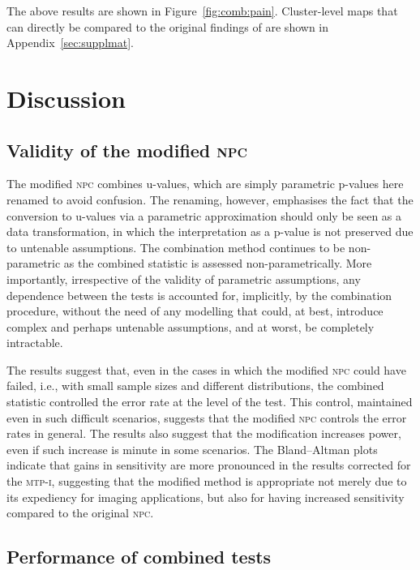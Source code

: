 The above results are shown in Figure~\ref{fig:comb:pain}. Cluster-level maps that can directly be compared to the original findings of \citet{Brooks2005} are shown in Appendix~\ref{sec:supplmat}.

\section{Discussion}

\subsection{Validity of the modified \textsc{npc}}

The modified \textsc{npc} combines u-values, which are simply parametric p-values here renamed to avoid confusion. The renaming, however, emphasises the fact that the conversion to u-values via a parametric approximation should only be seen as a data transformation, in which the interpretation as a p-value is not preserved due to untenable assumptions. The combination method continues to be non-parametric as the combined statistic is assessed non-parametrically. More importantly, irrespective of the validity of parametric assumptions, any dependence between the tests is accounted for, implicitly, by the combination procedure, without the need of any modelling that could, at best, introduce complex and perhaps untenable assumptions, and at worst, be completely intractable.

The results suggest that, even in the cases in which the modified \textsc{npc} could have failed, i.e., with small sample sizes and different distributions, the combined statistic controlled the error rate at the level of the test. This control, maintained even in such difficult scenarios, suggests that the modified \textsc{npc} controls the error rates in general. The results also suggest that the modification increases power, even if such increase is minute in some scenarios. The Bland--Altman plots indicate that gains in sensitivity are more pronounced in the results corrected for the \textsc{mtp-i}, suggesting that the modified method is appropriate not merely due to its expediency for imaging applications, but also for having increased sensitivity compared to the original \textsc{npc}.

\subsection{Performance of combined tests}

